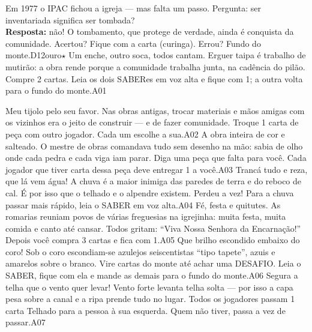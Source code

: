 {
{Em 1977 o IPAC fichou a igreja --- mas falta um passo.}
{Pergunta: ser inventariada significa ser tombada?\\ \textbf{Resposta:} não! O tombamento, que protege de verdade, ainda é conquista da comunidade.}
{Acertou? Fique com a carta (curinga). Errou? Fundo do monte.}{D12}{ouro}{$\star$}}
{
{Um enche, outro soca, todos cantam.}
{Erguer taipa é trabalho de mutirão: a obra rende porque a comunidade trabalha junta, na cadência do pilão.}
{Compre 2 cartas. Leia os dois SABERes em voz alta e fique com 1; a outra volta para o fundo do monte.}{A01}{}{}}
\newpage

\linhacartas
{
{Meu tijolo pelo seu favor.}
{Nas obras antigas, trocar materiais e mãos amigas com os vizinhos era o jeito de construir --- e de fazer comunidade.}
{Troque 1 carta de peça com outro jogador. Cada um escolhe a sua.}{A02}{}{}}
{
{A obra inteira de cor e salteado.}
{O mestre de obras comandava tudo sem desenho na mão: sabia de olho onde cada pedra e cada viga iam parar.}
{Diga uma peça que falta para você. Cada jogador que tiver carta dessa peça deve entregar 1 a você.}{A03}{}{}}
{
{Trancá tudo e reza, que lá vem água!}
{A chuva é a maior inimiga das paredes de terra e do reboco de cal. É por isso que o telhado e o alpendre existem.}
{Perdeu a vez! Para a chuva passar mais rápido, leia o SABER em voz alta.}{A04}{}{}}
\linhacartas
{
{Fé, festa e quitutes.}
{As romarias reuniam povos de várias freguesias na igrejinha: muita festa, muita comida e canto até cansar.}
{Todos gritam: ``Viva Nossa Senhora da Encarnação!'' Depois você compra 3 cartas e fica com 1.}{A05}{}{}}
{
{Que brilho escondido embaixo do coro!}
{Sob o coro escondiam-se azulejos seiscentistas ``tipo tapete'', azuis e amarelos sobre o branco.}
{Vire cartas do monte até achar uma DESAFIO. Leia o SABER, fique com ela e mande as demais para o fundo do monte.}{A06}{}{}}
{
{Segura a telha que o vento quer levar!}
{Vento forte levanta telha solta --- por isso a capa pesa sobre a canal e a ripa prende tudo no lugar.}
{Todos os jogadores passam 1 carta Telhado para a pessoa à sua esquerda. Quem não tiver, passa a vez de passar.}{A07}{}{}}
